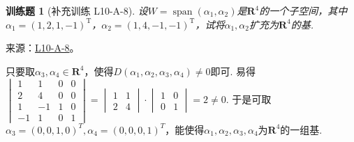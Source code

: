 \documentclass[UTF8,12pt,a4paper,fontset=fandol]{ctexart}
\newtheorem{exercise}{训练题}[section]
\begin{document}
\begin{exercise}[补充训练 L10-A-8]\label{prob:L10-A-8}
设$W=\operatorname{span}(\alpha_1,\alpha_2)$是$\mathbf{R}^4$的一个子空间，其中$\alpha_1=(1,2,1,-1)^\mathrm{T}$，$\alpha_2=(1,4,-1,-1)^\mathrm{T}$，试将$\alpha_1,\alpha_2$扩充为$\mathbf{R}^4$的基.
\end{exercise}
\noindent 来源：\href{https://github.com/yhwu-is/Linear-Algebra-Left-Undone/blob/new/%E8%AE%B2%E4%B9%89/%E4%B8%93%E9%A2%98/10%20%E8%A1%8C%E5%88%97%E5%BC%8F.tex}{L10-A-8}。
\begin{solve}
只要取$\alpha_3,\alpha_4 \in \mathbf{R}^4$，使得$D(\alpha_1,\alpha_2,\alpha_3,\alpha_4) \neq 0$即可. 易得$\begin{vmatrix}
                1  & 1  & 0 & 0 \\
                2  & 4  & 0 & 0 \\
                1  & -1 & 1 & 0 \\
                -1 & 1  & 0 & 1
            \end{vmatrix}=\begin{vmatrix}
                1 & 1 \\
                2 & 4
            \end{vmatrix} \cdot \begin{vmatrix}
                1 & 0 \\
                0 & 1
            \end{vmatrix}=2 \neq 0$. 于是可取$\alpha_3=(0,0,1,0)^T,\alpha_4=(0,0,0,1)^T$，能使得${\alpha_1,\alpha_2,\alpha_3,\alpha_4}$为$\mathbf{R}^4$的一组基.
\end{solve}
\end{document}
